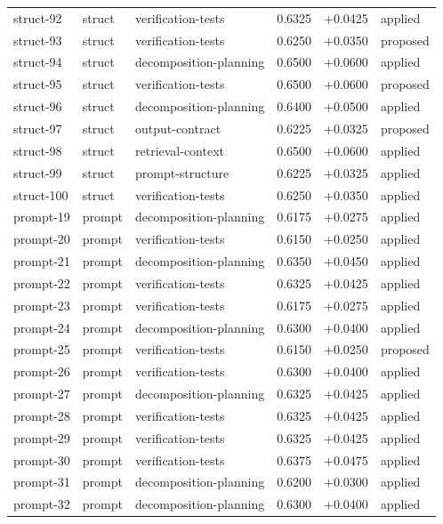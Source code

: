 \begin{center}
\begin{longtable}{llp{5.2cm}rrl}
struct-92 & struct & verification-tests & 0.6325 & +0.0425 & applied \\
struct-93 & struct & verification-tests & 0.6250 & +0.0350 & proposed \\
struct-94 & struct & decomposition-planning & 0.6500 & +0.0600 & applied \\
struct-95 & struct & verification-tests & 0.6500 & +0.0600 & proposed \\
struct-96 & struct & decomposition-planning & 0.6400 & +0.0500 & applied \\
struct-97 & struct & output-contract & 0.6225 & +0.0325 & proposed \\
struct-98 & struct & retrieval-context & 0.6500 & +0.0600 & applied \\
struct-99 & struct & prompt-structure & 0.6225 & +0.0325 & applied \\
struct-100 & struct & verification-tests & 0.6250 & +0.0350 & applied \\
prompt-19 & prompt & decomposition-planning & 0.6175 & +0.0275 & applied \\
prompt-20 & prompt & verification-tests & 0.6150 & +0.0250 & applied \\
prompt-21 & prompt & decomposition-planning & 0.6350 & +0.0450 & applied \\
prompt-22 & prompt & verification-tests & 0.6325 & +0.0425 & applied \\
prompt-23 & prompt & verification-tests & 0.6175 & +0.0275 & applied \\
prompt-24 & prompt & decomposition-planning & 0.6300 & +0.0400 & applied \\
prompt-25 & prompt & verification-tests & 0.6150 & +0.0250 & proposed \\
prompt-26 & prompt & verification-tests & 0.6300 & +0.0400 & applied \\
prompt-27 & prompt & decomposition-planning & 0.6325 & +0.0425 & applied \\
prompt-28 & prompt & verification-tests & 0.6325 & +0.0425 & applied \\
prompt-29 & prompt & verification-tests & 0.6325 & +0.0425 & applied \\
prompt-30 & prompt & verification-tests & 0.6375 & +0.0475 & applied \\
prompt-31 & prompt & decomposition-planning & 0.6200 & +0.0300 & applied \\
prompt-32 & prompt & decomposition-planning & 0.6300 & +0.0400 & applied \\

\end{longtable}
\end{center}

